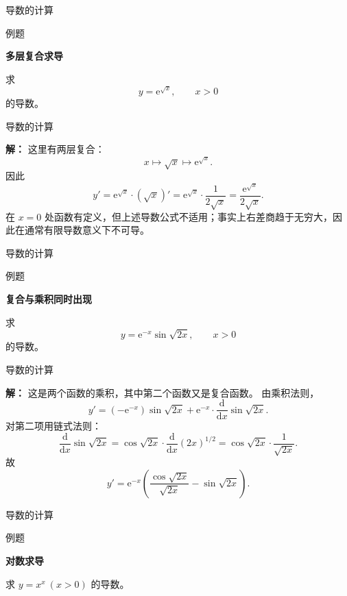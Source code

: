 \documentclass[aspectratio=169,10pt,fontset=fandol]{ctexbeamer}
\newcommand{\dd}{\mathrm{d}}
\newcommand{\ee}{\mathrm{e}}
\begin{document}
\begin{frame}[t,fragile]{导数的计算}
\footnotesize
\begin{block}{例题}
{\footnotesize
\textbf{多层复合求导}\par

	求
	\[
	y=\ee^{\sqrt{x}},\qquad x>0
	\]
	的导数。

}
\end{block}
\end{frame}
\begin{frame}[t,fragile]{导数的计算}
\footnotesize
{\footnotesize
\textbf{解：}
这里有两层复合：
	\[
	x\longmapsto \sqrt{x}\longmapsto \ee^{\sqrt{x}}.
	\]
	因此
	\[
	y'=\ee^{\sqrt{x}}\cdot(\sqrt{x})'
	=\ee^{\sqrt{x}}\cdot\frac{1}{2\sqrt{x}}
	=\frac{\ee^{\sqrt{x}}}{2\sqrt{x}}.
	\]
	在 $x=0$ 处函数有定义，但上述导数公式不适用；事实上右差商趋于无穷大，因此在通常有限导数意义下不可导。

}
\end{frame}
\begin{frame}[t,fragile]{导数的计算}
\footnotesize
\begin{block}{例题}
{\footnotesize
\textbf{复合与乘积同时出现}\par

	求
	\[
	y=\ee^{-x}\sin\sqrt{2x},\qquad x>0
	\]
	的导数。

}
\end{block}
\end{frame}
\begin{frame}[t,fragile]{导数的计算}
\footnotesize
{\footnotesize
\textbf{解：}
这是两个函数的乘积，其中第二个函数又是复合函数。 由乘积法则，
	\[
	y'=(-\ee^{-x})\sin\sqrt{2x}
	+\ee^{-x}\cdot\frac{\dd}{\dd x}\sin\sqrt{2x}.
	\]
	对第二项用链式法则：
	\[
	\frac{\dd}{\dd x}\sin\sqrt{2x}
	=\cos\sqrt{2x}\cdot\frac{\dd}{\dd x}(2x)^{1/2}
	=\cos\sqrt{2x}\cdot\frac1{\sqrt{2x}}.
	\]
	故
	\[
	y'=\ee^{-x}\left(\frac{\cos\sqrt{2x}}{\sqrt{2x}}-\sin\sqrt{2x}\right).
	\]

}
\end{frame}
\begin{frame}[t,fragile]{导数的计算}
\footnotesize
\begin{block}{例题}
{\footnotesize
\textbf{对数求导}\par

	求 $y=x^x\ (x>0)$ 的导数。

}
\end{block}
\end{frame}
\end{document}
